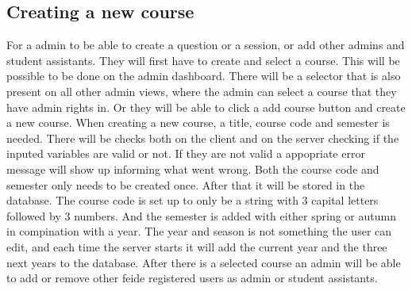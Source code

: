\subsection{Creating a new course}
For a admin to be able to create a question or a session, or add other admins and student assistants. They will first have to create and select a course. This will be possible to be done on the admin dashboard. There will be a selector that is also present on all other admin views, where the admin can select a course that they have admin rights in. Or they will be able to click a add course button and create a new course. When creating a new course, a title, course code and semester is needed. There will be checks both on the client and on the server checking if the inputed variables are valid or not. If they are not valid a appopriate error message will show up informing what went wrong. Both the course code and semester only needs to be created once. After that it will be stored in the database. The course code is set up to only be a string with 3 capital letters followed by 3 numbers. And the semester is added with either spring or autumn in compination with a year. The year and season is not something the user can edit, and each time the server starts it will add the current year and the three next years to the database. After there is a selected course an admin will be able to add or remove other feide registered users as admin or student assistants.